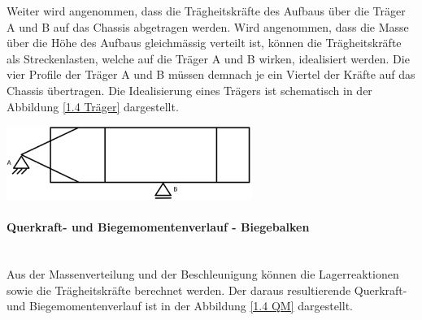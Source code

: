   Weiter wird angenommen, dass die Trägheitskräfte des Aufbaus über die Träger A und B auf das Chassis abgetragen werden. Wird angenommen, dass die Masse über die Höhe des Aufbaus gleichmässig verteilt ist, können die Trägheitskräfte als Streckenlasten, welche auf die Träger A und B wirken, idealisiert werden. Die vier Profile der Träger A und B müssen demnach je ein Viertel der Kräfte auf das Chassis übertragen. Die Idealisierung eines Trägers ist schematisch in der Abbildung \ref{1.4 Träger} dargestellt.

  \begin{center}
    \includegraphics[width=0.6\textwidth]{04_Figures/1.4 Lagerung.png}
    \label{1.4 Lagerung}
  \end{center}

  \paragraph{Querkraft- und Biegemomentenverlauf - Biegebalken}\mbox{}\\
  Aus der Massenverteilung und der Beschleunigung können die Lagerreaktionen sowie die Trägheitskräfte berechnet werden. Der daraus resultierende Querkraft- und Biegemomentenverlauf ist in der Abbildung \ref{1.4 QM} dargestellt.

